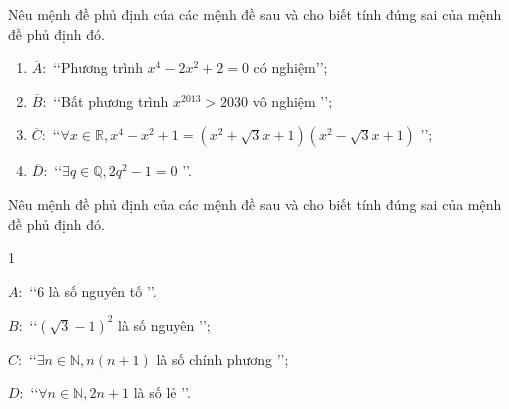 \begin{bt}%
	Nêu mệnh đề phủ định cúa các mệnh  đề sau và cho biết tính đúng sai của mệnh đề phủ định đó.
	\begin{enumerate}
		\item $\overline{A}:$ \lq\lq Phương trình  $x^4-2x^2+2=0$ có nghiệm\rq\rq;
		\item $\overline{B}:$  \lq\lq Bất phương trình $x^{2013}>2030$ vô nghiệm \rq\rq;
		\item  $\overline{C}:$ \lq\lq $\forall x\in\mathbb{R}, x^4-x^2+1=\left(x^2+\sqrt 3x+1\right)\left(x^2-\sqrt 3x+1\right)$ \rq\rq;
		\item $\overline{D}:$ \lq\lq $\exists q\in\mathbb{Q}, 2q^2-1=0  $ \rq\rq.
	\end{enumerate}
\end{bt}

\begin{bt}%
	Nêu mệnh đề phủ định của các mệnh  đề sau và cho biết tính đúng sai của mệnh đề phủ định đó.
	\begin{enumEX}{1}
		\item $A:$ \lq\lq 6 là  số nguyên tố \rq\rq.
		\item $B:$ \lq\lq $(\sqrt 3-1)^2$  là số nguyên \rq\rq;
		\item $C:$ \lq\lq $\exists n\in\mathbb{N}, n(n+1)$ là số chính phương \rq\rq; 
		 \item $D:$ \lq\lq $\forall n\in\mathbb{N}, 2n+1$ là số lẻ \rq\rq.
	\end{enumEX}
\end{bt}

